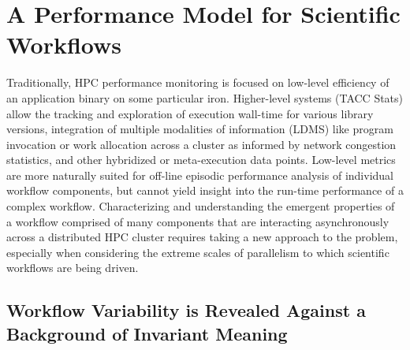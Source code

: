 \section{A Performance Model for Scientific Workflows}
Traditionally, HPC performance monitoring is focused on low-level efficiency of 
an application binary on some particular iron.  Higher-level systems (TACC 
Stats) allow the tracking and exploration of execution wall-time for various 
library versions, integration of multiple modalities of information (LDMS) like 
program invocation or work allocation across a cluster as informed by network 
congestion statistics, and other hybridized or meta-execution data points. 
Low-level metrics are more naturally suited for off-line episodic 
performance analysis of individual workflow components, but cannot yield insight 
into the run-time performance of a complex workflow.  Characterizing and 
understanding the emergent properties of a workflow comprised 
of many components that are interacting asynchronously across a distributed HPC 
cluster requires taking a new approach to the problem, especially when 
considering the extreme scales of parallelism to which scientific workflows are 
being driven. 
\subsection{Workflow Variability is Revealed Against a Background of Invariant Meaning}


